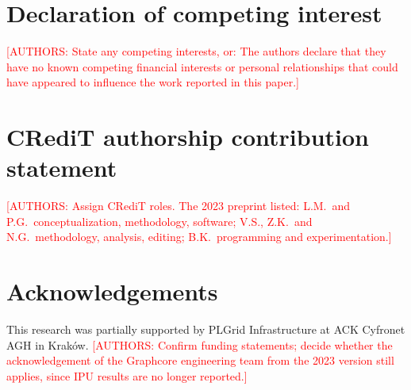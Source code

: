 \documentclass[preprint,12pt]{elsarticle}
\newcommand{\authors}[1]{\textcolor{red}{[AUTHORS: #1]}}
\begin{document}
\section*{Declaration of competing interest}
\authors{State any competing interests, or: The authors declare that they have
no known competing financial interests or personal relationships that could
have appeared to influence the work reported in this paper.}

\section*{CRediT authorship contribution statement}
\authors{Assign CRediT roles. The 2023 preprint listed: L.M.\ and P.G.\
conceptualization, methodology, software; V.S., Z.K.\ and N.G.\ methodology,
analysis, editing; B.K.\ programming and experimentation.}

\section*{Acknowledgements}
This research was partially supported by PLGrid Infrastructure at ACK
Cyfronet AGH in Krak{\'o}w. \authors{Confirm funding statements; decide
whether the acknowledgement of the Graphcore engineering team from the 2023
version still applies, since IPU results are no longer reported.}



\end{document}
